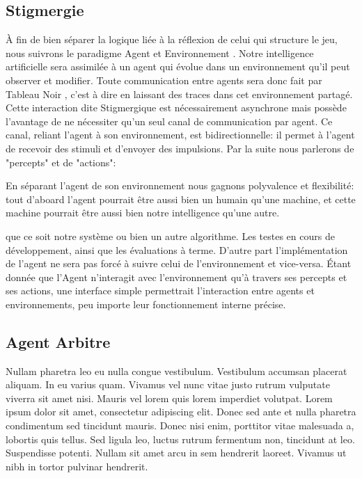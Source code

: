 \subsection{ \og Stigmergie \fg{} }

À fin de bien séparer la logique liée à la réflexion de celui qui structure le jeu, nous suivrons le paradigme \og Agent et Environnement \fg{}. Notre intelligence artificielle sera assimilée à un agent qui évolue dans un environnement qu'il peut observer et modifier. 
Toute communication entre agents sera donc fait par \og Tableau Noir \fg{}, c'est à dire en laissant des traces dans cet environnement partagé. Cette interaction dite \og Stigmergique \fg{} est nécessairement asynchrone mais possède l'avantage de ne nécessiter qu'un seul canal de communication par agent.
Ce canal, reliant l'agent à son environnement, est bidirectionnelle: il permet à l'agent de recevoir des stimuli et d'envoyer des impulsions. Par la suite nous parlerons de "percepts" et de "actions":


En séparant l'agent de son environnement nous gagnons polyvalence et flexibilité: tout d'aboard l'agent pourrait être aussi bien un humain qu'une machine, et cette machine pourrait être aussi bien notre intelligence qu'une autre.

 que ce soit notre système ou bien un autre algorithme. Les testes en cours de développement, ainsi que les évaluations à terme.
D'autre part l'implémentation de l'agent ne sera pas forcé à suivre celui de l'environnement et vice-versa. Étant donnée que l'Agent n'interagit avec l'environnement qu'à travers ses percepts et ses actions, une interface simple permettrait l'interaction entre agents et environnements, peu importe leur fonctionnement interne précise.

\subsection{ Agent \og Arbitre \fg{} }

Nullam pharetra leo eu nulla congue vestibulum. Vestibulum accumsan placerat aliquam. In eu varius quam. Vivamus vel nunc vitae justo rutrum vulputate viverra sit amet nisi. Mauris vel lorem quis lorem imperdiet volutpat. Lorem ipsum dolor sit amet, consectetur adipiscing elit. Donec sed ante et nulla pharetra condimentum sed tincidunt mauris. Donec nisi enim, porttitor vitae malesuada a, lobortis quis tellus. Sed ligula leo, luctus rutrum fermentum non, tincidunt at leo. Suspendisse potenti. Nullam sit amet arcu in sem hendrerit laoreet. Vivamus ut nibh in tortor pulvinar hendrerit. 

